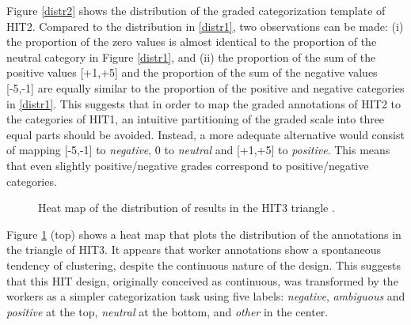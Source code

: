 \documentclass[11pt, a4paper,onecolumn]{article}
\begin{document}
Figure \ref{distr2} shows the distribution of the graded categorization template of HIT2. Compared to the distribution in \ref{distr1}, two observations can be made: (i) the proportion of the zero values is almost identical to the proportion of the neutral category in Figure \ref{distr1}, and (ii) the proportion of the sum of the positive values [+1,+5] and the proportion of the sum of the negative values [-5,-1] are equally similar to the proportion of the positive and negative categories in \ref{distr1}. This suggests that in order to map the graded annotations of HIT2 to the categories of HIT1, an intuitive partitioning of the graded scale into three equal parts should be avoided. Instead, a more adequate alternative would consist of mapping [-5,-1] to \textit{negative}, 0 to \textit{neutral} and [+1,+5] to \textit{positive}. This means that even slightly positive/negative grades correspond to positive/negative categories.



\begin{figure}[h]
  \begin{center}
	\caption{Heat map of the distribution of results in the HIT3 triangle .}
	\label{distr3}
  \end{center}
\end{figure}

Figure \ref{distr3} (top) shows a heat map that plots the distribution of the annotations in the triangle of HIT3. It appears that worker annotations show a spontaneous tendency of clustering, despite the continuous nature of the design. This suggests that this HIT design, originally conceived as continuous, was transformed by the workers as a simpler categorization task using five labels: \textit{negative}, \textit{ambiguous} and \textit{positive} at the top, \textit{neutral} at the bottom, and \textit{other} in the center.
\end{document}

